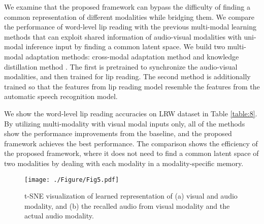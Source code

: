 \documentclass[10pt,twocolumn,letterpaper]{article}
\begin{document}
We examine that the proposed framework can bypass the difficulty of finding a common representation of different modalities while bridging them. We compare the performance of word-level lip reading with the previous multi-modal learning methods that can exploit shared information of audio-visual modalities with uni-modal inference input by finding a common latent space. We build two multi-modal adaptation methods: cross-modal adaptation method \cite{Chung16sync} and knowledge distillation method \cite{hinton2015distilling}. The first is pretrained to synchronize the audio-visual modalities, and then trained for lip reading. The second method is additionally trained so that the features from lip reading model resemble the features from the automatic speech recognition model.

We show the word-level lip reading accuracies on LRW dataset in Table \ref{table:8}. 
By utilizing multi-modality with visual modal inputs only, all of the methods show the performance improvements from the baseline, and the proposed framework achieves the best performance. The comparison shows the efficiency of the proposed framework, where it does not need to find a common latent space of two modalities by dealing with each modality in a modality-specific memory.

\begin{figure}[t!]
	\begin{minipage}[b]{1.0\linewidth}
		\centering
		\centerline{\texttt{[image: ./Figure/Fig5.pdf]}}
	\end{minipage}
	\caption{t-SNE \cite{van2008tsne} visualization of learned representation of (a) visual and audio modality, and (b) the recalled audio from visual modality and the actual audio modality.}
	\label{fig:5}
	\vspace{-0.2cm}
\end{figure}


\begin{table}
\centering
	\renewcommand{\tabcolsep}{1.5mm}
    \vspace{0cm}
    \caption{Lip reading word accuracy comparison with learning methods of finding a common representation of multi-modality.}
    \vspace{-0.5cm}
	\label{table:8}
\end{table}
\end{document}
